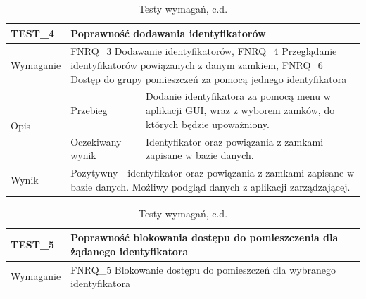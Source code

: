         \begin{table}[h!]
            \ContinuedFloat
            \caption{Testy wymagań, c.d.}
            \begin{subtable}[c]{\textwidth}
                \centering
                    \begin{tabular}{p{2cm}|p{}|p{}}
                    TEST\_4               & \multicolumn{2}{l}{\textbf{Poprawność dodawania identyfikatorów}}                                                            \\ \hline
                    Wymaganie             & \multicolumn{2}{p{12cm}}{FNRQ\_3 Dodawanie identyfikatorów, FNRQ\_4 Przeglądanie identyfikatorów powiązanych z danym zamkiem, FNRQ\_6 Dostęp do grupy pomieszczeń za pomocą jednego identyfikatora }                                                                                    \\ \hline
                    \multirow{2}{*}{Opis} & Przebieg           & Dodanie identyfikatora za pomocą menu w aplikacji GUI, wraz z wyborem zamków, do których będzie upoważniony.  \\ \cline{2-3}
                                         & Oczekiwany wynik   & Identyfikator oraz powiązania z zamkami zapisane w bazie danych.                                                 \\ \hline
                    Wynik                 & \multicolumn{2}{p{12cm}}{Pozytywny - identyfikator oraz powiązania z zamkami zapisane w bazie danych. Możliwy podgląd danych z aplikacji zarządzającej.} \\
                    \end{tabular}%
                \label{tbl:test4}
                \vspace{10mm}
            \end{subtable}
        \quad%
            \begin{subtable}[c]{\textwidth}
                \centering
                    \begin{tabular}{p{2cm}|p{}|p{}}
                    TEST\_5               & \multicolumn{2}{p{12cm}}{\textbf{Poprawność blokowania dostępu do pomieszczenia dla żądanego identyfikatora}}                                                            \\ \hline
                    Wymaganie             & \multicolumn{2}{p{12cm}}{FNRQ\_5 Blokowanie dostępu do pomieszczeń dla wybranego identyfikatora }                                                                                    \\ \hline

\end{tabular}
\end{subtable}
\end{table}
